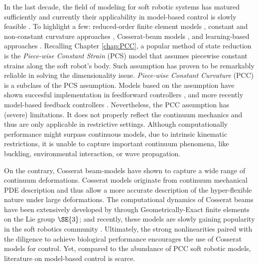In the last decade, the field of modeling for soft robotic systems has matured sufficiently and currently their applicability in model-based control is slowly feasible \cite{DellaSantina2021}. To highlight a few: reduced-order finite element models \cite{Duriez2013,Zhang2017,Wu2021}, constant and non-constant curvature approaches \cite{Katzschmann2019,DellaSantina2020}, Cosserat-beam models \cite{Renda2020,Boyer2021}, and learning-based approaches \cite{Bruder2019}. 
Recalling Chapter \ref{chap:PCC}, a popular method of state reduction is the \textit{Piece-wise Constant Strain} (PCS) model that assumes piecewise constant strains along the soft robot's body. Such assumption has proven to be remarkably reliable in solving the dimensionality issue. \textit{Piece-wise Constant Curvature} (PCC) is a subclass of the PCS assumption. Models based on the assumption have shown succesful implementation in feedforward controllers \cite{Falkenhahn2015}, and more recently model-based feedback controllers \cite{DellaSantina2020,Katzschmann2019}. Nevertheless, the PCC assumption has (severe) limitations. It does not properly reflect the continuum mechanics and thus are only applicable in restrictive settings. Although computationally performance might surpass continuous models, due to intrinsic kinematic restrictions, it is unable to capture important continuum phenomena, like buckling, environmental interaction, or wave propagation.

On the contrary, Cosserat beam-models have shown to capture a wide range of continuum deformations. Cosserat models originate from continuum mechanical PDE description and thus allow a more accurate description of the hyper-flexible nature under large deformations. The computational dynamics of Cosserat beams have been extensively developed by \cite{Simo1986} through Geometrically-Exact finite elements on the Lie group $\SE{3}$; and recently, these models are slowly gaining popularity in the soft robotics community \cite{Renda2018,Renda2020,Boyer2021,Till2019,Gazzola2018}. Ultimately, the strong nonlinearities paired with the diligence to achieve biological performance encourages the use of Cosserat models for control. Yet, compared to the abundance of PCC soft robotic models, literature on model-based control is scarce.

